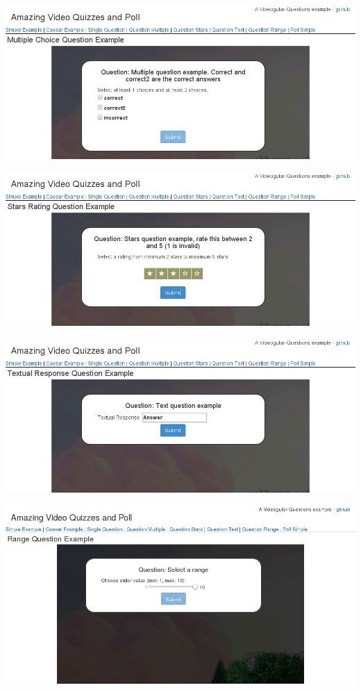 \includegraphics[width=\textwidth]{screenshots/videogular-questions-example-question-multiple.png}

\includegraphics[width=\textwidth]{screenshots/videogular-questions-example-question-stars.png}

\includegraphics[width=\textwidth]{screenshots/videogular-questions-example-question-text.png}

\includegraphics[width=\textwidth]{screenshots/videogular-questions-example-question-range.png}

